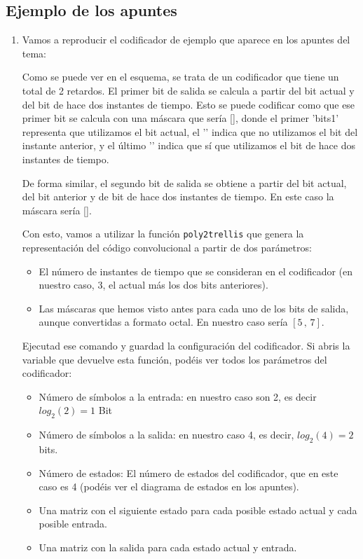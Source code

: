 \documentclass[es,practica,12pt]{uah}
\begin{document}
\subsection{Ejemplo de los apuntes}
	\begin{enumerate}
	
		\item Vamos a reproducir el codificador de ejemplo que aparece en los apuntes del tema:

		Como se puede ver en el esquema, se trata de un codificador que tiene un total de 2 retardos. El primer bit de salida se calcula a partir del bit actual y del bit de hace dos instantes de tiempo. Esto se puede codificar como que ese primer bit se calcula con una máscara que sería [], donde el primer 'bits{1}' representa que utilizamos el bit actual, el '' indica que no utilizamos el bit del instante anterior, y el último '' indica que sí que utilizamos el bit de hace dos instantes de tiempo. 

		De forma similar, el segundo bit de salida se obtiene a partir del bit actual, del bit anterior y de bit de hace dos instantes de tiempo. En este caso la máscara sería []. 

		Con esto, vamos a utilizar la función \texttt{poly2trellis} que genera la representación del código convolucional a partir de dos parámetros:

		\begin{itemize}
				\item El número de instantes de tiempo que se consideran en el codificador (en nuestro caso, 3, el actual más los dos bits anteriores).
				\item Las máscaras que hemos visto antes para cada uno de los bits de salida, aunque convertidas a formato octal. En nuestro caso sería $[5 \, ,\, 7]$.
		\end{itemize}

		Ejecutad ese comando y guardad la configuración del codificador. Si abris la variable que devuelve esta función, podéis ver todos los parámetros del codificador: 
		\begin{itemize}
			\item Número de símbolos a la entrada: en nuestro caso son 2, es decir $log_2(2) = 1$ Bit
			\item Número de símbolos a la salida: en nuestro caso 4, es decir, $log_2(4) = 2$ bits. 
			\item Número de estados: El número de estados del codificador, que en este caso es 4 (podéis ver el diagrama de estados en los apuntes).
			\item Una matriz con el siguiente estado para cada posible estado actual y cada posible entrada.
			\item Una matriz con la salida para cada estado actual y entrada. 
		\end{itemize}
		

\end{enumerate}
\end{document}
